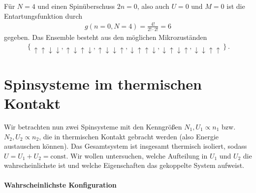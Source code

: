 Für $N=4$ und einen Spinüberschuss $2n=0$, also auch $U=0$ und $M=0$ ist die Entartungsfunktion durch
\begin{align*}
    g(n=0,N=4) = \frac{4!}{2!\cdot 2!} = 6
\end{align*}
gegeben. Das Ensemble besteht aus den möglichen Mikrozuständen
\begin{align*}
    \left\{ \uparrow\uparrow\downarrow\downarrow,\uparrow\downarrow\uparrow\downarrow,\uparrow\downarrow\downarrow\uparrow,\downarrow\uparrow\uparrow\downarrow,\downarrow\uparrow\downarrow\uparrow,\downarrow\downarrow\uparrow\uparrow \right\}.
\end{align*}



\section{Spinsysteme im thermischen Kontakt}

Wir betrachten nun zwei Spinsysteme mit den Kenngrößen $N_1,U_1\propto n_1$ bzw. $N_2,U_2\propto n_2$, die in thermischen Kontakt gebracht werden (also Energie austauschen können). Das Gesamtsystem ist insgesamt thermisch isoliert, sodass $U=U_1+U_2=\mathrm{const}$.
Wir wollen untersuchen, welche Aufteilung in $U_1$ und $U_2$ die wahrscheinlichste ist und welche Eigenschaften das gekoppelte System aufweist.


\paragraph*{Wahrscheinlichste Konfiguration}


